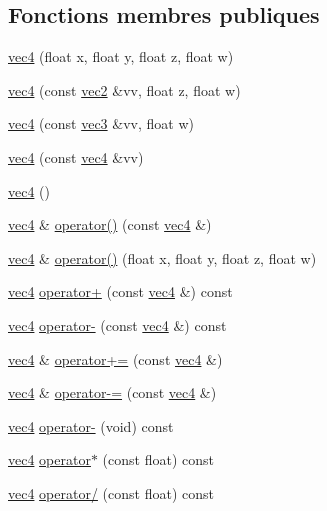 \subsection*{Fonctions membres publiques}
\begin{DoxyCompactItemize}
\item 
\hyperlink{structvec4_a4174b718621ba5b473ea2c289f11fe46}{vec4} (float x, float y, float z, float w)
\item 
\hyperlink{structvec4_ab203f1386ef0b79671e9a1324ceee484}{vec4} (const \hyperlink{structvec2}{vec2} \&vv, float z, float w)
\item 
\hyperlink{structvec4_a8ba17db652f62b23a98cd481390f35da}{vec4} (const \hyperlink{structvec3}{vec3} \&vv, float w)
\item 
\hyperlink{structvec4_a6e60f39758cb651bd4c8fba56119dfad}{vec4} (const \hyperlink{structvec4}{vec4} \&vv)
\item 
\hyperlink{structvec4_aa29685cf2528dae6ad7d74a7e01c1d6f}{vec4} ()
\item 
\hyperlink{structvec4}{vec4} \& \hyperlink{structvec4_ac4e06f2b7a49cd0c3cc5ea7b10954c00}{operator()} (const \hyperlink{structvec4}{vec4} \&)
\item 
\hyperlink{structvec4}{vec4} \& \hyperlink{structvec4_a6acc9e41ef36534bf19b997584eb9df7}{operator()} (float x, float y, float z, float w)
\item 
\hyperlink{structvec4}{vec4} \hyperlink{structvec4_aa64bbda7f03446e55173b504e3b90dfb}{operator+} (const \hyperlink{structvec4}{vec4} \&) const 
\item 
\hyperlink{structvec4}{vec4} \hyperlink{structvec4_ad2e9143d8272682349c159841c668154}{operator-\/} (const \hyperlink{structvec4}{vec4} \&) const 
\item 
\hyperlink{structvec4}{vec4} \& \hyperlink{structvec4_aa8a7cfc967df78a799519bb3bbdaf52f}{operator+=} (const \hyperlink{structvec4}{vec4} \&)
\item 
\hyperlink{structvec4}{vec4} \& \hyperlink{structvec4_a9e9e9191d4dae56b2d2936c94cda27c6}{operator-\/=} (const \hyperlink{structvec4}{vec4} \&)
\item 
\hyperlink{structvec4}{vec4} \hyperlink{structvec4_a8be92ecc5684b4c49e6ae5dacd6ea699}{operator-\/} (void) const 
\item 
\hyperlink{structvec4}{vec4} \hyperlink{structvec4_ac0899c2ebc9ec2e017034b41cf52d4ab}{operator$\ast$} (const float) const 
\item 
\hyperlink{structvec4}{vec4} \hyperlink{structvec4_af5b5276358f3c30bab7ebe177ed6bf1f}{operator/} (const float) const 

\end{DoxyCompactItemize}
